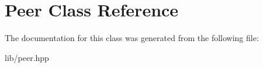 \hypertarget{classPeer}{}\section{Peer Class Reference}
\label{classPeer}


The documentation for this class was generated from the following file\+:\begin{DoxyCompactItemize}
\item 
lib/peer.\+hpp\end{DoxyCompactItemize}
